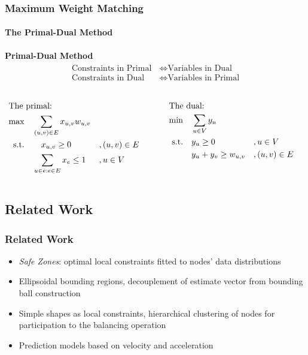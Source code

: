 \documentclass[hyperref={pdfpagelabels=false}]{beamer}
\begin{document}
\begin{frame} \frametitle{Maximum Weight Matching}\framesubtitle{The Primal-Dual Method}
\textbf{Primal-Dual Method}
\begin{align*}
\begin{split}
\text{Constraints in Primal}&\Longleftrightarrow \text{Variables in Dual}\\
\text{Constraints in Dual}\quad &\Longleftrightarrow \text{Variables in Primal}
\end{split}
\end{align*}
\begin{columns}
\begin{column}[t]{0.49\textwidth}
\vspace{-1.5cm}
\begin{align*}
\intertext{The primal:}
\max&\quad \sum_{(u,v) \in E} x_{u,v} w_{u,v}\\
\text{s.t.} &\qquad x_{u,v}\geq 0 &&, (u,v) \in E \\
	&\quad \sum_{u \in e: e\in E} x_e \leq 1 &&, u \in V
\end{align*}\end{column}
\begin{column}[t]{0.49\textwidth}
\vspace{-1.5cm}
\begin{align*}
\intertext{The dual:}
\min&\quad \sum_{u \in V} y_u\\
\text{s.t.} &\quad y_u\geq 0 &&, u \in V\\
	&\quad y_u+y_v \geq w_{u,v} &&,(u,v) \in E
\end{align*}
\end{column}
\end{columns}
\end{frame}

\subsection{Related Work}
\begin{frame} \frametitle{Related Work}
\begin{itemize}
\item \emph{Safe Zones}: optimal local constraints fitted to nodes' data distributions %
\item Ellipsoidal bounding regions, decouplement of estimate vector from bounding ball construction%
\item Simple shapes as local constraints, hierarchical clustering of nodes for participation to the balancing operation%
\item Prediction models based on velocity and acceleration%
\end{itemize}
\end{frame}
\end{document}
